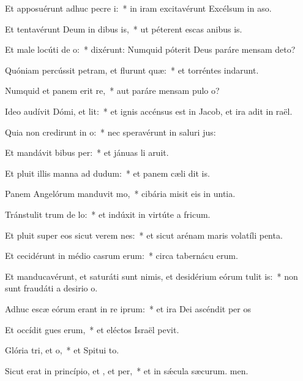 \item Et apposuérunt adhuc pecre i:~* in iram excitavérunt Excélsum in aso.
\item Et tentavérunt Deum in dibus is,~* ut péterent escas anibus is.
\item Et male locúti  de o:~* dixérunt: Numquid póterit Deus paráre mensam  deto?
\item Quóniam percússit petram, et flurunt quæ:~* et torréntes indarunt.
\item Numquid et panem erit re,~* aut paráre mensam pulo o?
\item Ideo audívit Dómi, et lit:~* et ignis accénsus est in Jacob, et ira adit in raël.
\item Quia non credirunt in o:~* nec speravérunt in saluri jus:
\item Et mandávit bibus per:~* et jánuas li aruit.
\item Et pluit illis manna ad dudum:~* et panem cæli dit is.
\item Panem Angelórum manduvit mo,~* cibária misit eis in untia.
\item Tránstulit trum de lo:~* et indúxit in virtúte a fricum.
\item Et pluit super eos sicut verem nes:~* et sicut arénam maris volatíli penta.
\item Et cecidérunt in médio casrum erum:~* circa tabernácu erum.
\item Et manducavérunt, et saturáti sunt nimis, et desidérium eórum tulit is:~* non sunt fraudáti a desirio o.
\item Adhuc escæ eórum erant in re iprum:~* et ira Dei ascéndit per os
\item Et occídit gues erum,~* et eléctos Israël pevit.
\item Glória tri, et o,~* et Spitui to.
\item Sicut erat in princípio, et , et per,~* et in sǽcula sæcurum. men.
